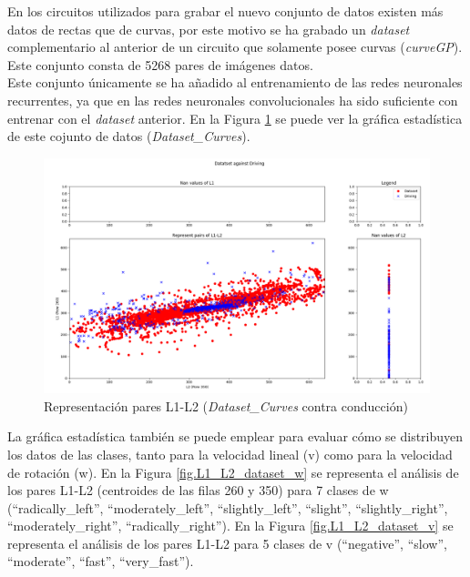 En los circuitos utilizados para grabar el nuevo conjunto de datos existen más datos de rectas que de curvas, por este motivo se ha grabado un \textit{dataset} complementario al anterior de un circuito que solamente posee curvas (\textit{curveGP}). Este conjunto consta de 5268 pares de imágenes datos.\\

Este conjunto únicamente se ha añadido al entrenamiento de las redes neuronales recurrentes, ya que en las redes neuronales convolucionales ha sido suficiente con entrenar con el \textit{dataset} anterior. En la Figura \ref{fig.L1_L2_dataset_curves} se puede ver la gráfica estadística de este cojunto de datos (\textit{Dataset\_Curves}).\\

\begin{figure}
  \begin{center}
    \includegraphics[width=1\textwidth]{figures/Infraestructura/L1_L2_Dataset_Curves.png}
		\caption{Representación pares L1-L2 (\textit{Dataset\_Curves} contra conducción)}
		\label{fig.L1_L2_dataset_curves}
		\end{center}
\end{figure}

La gráfica estadística también se puede emplear para evaluar cómo se distribuyen los datos de las clases, tanto para la velocidad lineal (v) como para la velocidad de rotación (w). En la Figura \ref{fig.L1_L2_dataset_w} se representa el análisis de los pares L1-L2 (centroides de las filas 260 y 350) para 7 clases de w (``radically\_left'', ``moderately\_left'', ``slightly\_left'', ``slight'', ``slightly\_right'', ``moderately\_right'', ``radically\_right''). En la Figura \ref{fig.L1_L2_dataset_v} se representa el análisis de los pares L1-L2 para 5 clases de v (``negative'', ``slow'', ``moderate'', ``fast'', ``very\_fast''). \\


